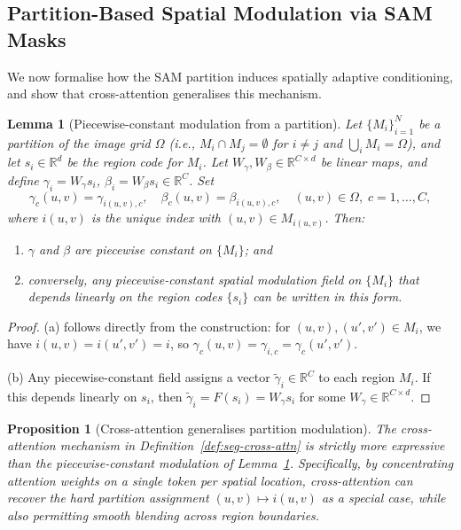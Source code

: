 \documentclass[12pt]{article}
\newtheorem{lemma}[theorem]{Lemma}
\newtheorem{proposition}[theorem]{Proposition}
\begin{document}
\subsection{Partition-Based Spatial Modulation via SAM Masks}
\label{sec:partition}

We now formalise how the SAM partition induces spatially adaptive
conditioning, and show that cross-attention generalises this mechanism.

\begin{lemma}[Piecewise-constant modulation from a partition]
\label{lem:partition}
Let $\{M_i\}_{i=1}^{N}$ be a partition of the image grid $\Omega$
(i.e., $M_i \cap M_j = \emptyset$ for $i \neq j$ and
$\bigcup_i M_i = \Omega$), and let $s_i \in \mathbb{R}^{d}$ be
the region code for $M_i$.
Let $W_\gamma, W_\beta \in \mathbb{R}^{C \times d}$ be linear maps,
and define
$\gamma_i = W_\gamma s_i$, $\beta_i = W_\beta s_i \in \mathbb{R}^C$.
Set
\begin{equation}\label{eq:pw-modulation}
    \gamma_c(u,v) = \gamma_{i(u,v),c}, \quad
    \beta_c(u,v) = \beta_{i(u,v),c},
    \quad (u,v) \in \Omega,\; c = 1,\ldots,C,
\end{equation}
where $i(u,v)$ is the unique index with $(u,v) \in M_{i(u,v)}$.
Then:
\begin{enumerate}
    \item[\textup{(a)}] $\gamma$ and $\beta$ are piecewise constant on
    $\{M_i\}$; and
    \item[\textup{(b)}] conversely, any piecewise-constant spatial modulation
    field on $\{M_i\}$ that depends linearly on the region codes
    $\{s_i\}$ can be written in this form.
\end{enumerate}
\end{lemma}

\begin{proof}
(a) follows directly from the construction: for $(u,v), (u',v') \in M_i$,
we have $i(u,v) = i(u',v') = i$, so $\gamma_c(u,v) = \gamma_{i,c} = \gamma_c(u',v')$.

(b) Any piecewise-constant field assigns a vector $\tilde{\gamma}_i \in \mathbb{R}^C$
to each region $M_i$.
If this depends linearly on $s_i$, then
$\tilde{\gamma}_i = F(s_i) = W_\gamma s_i$ for some $W_\gamma \in \mathbb{R}^{C \times d}$.
\end{proof}

\begin{proposition}[Cross-attention generalises partition modulation]
\label{prop:cross-attn-generalises}
The cross-attention mechanism in Definition~\ref{def:seg-cross-attn}
is strictly more expressive than the piecewise-constant modulation
of Lemma~\ref{lem:partition}.
Specifically, by concentrating attention weights on a single token per
spatial location, cross-attention can recover the hard partition assignment
$(u,v) \mapsto i(u,v)$ as a special case, while also permitting
smooth blending across region boundaries.
\end{proposition}
\end{document}
